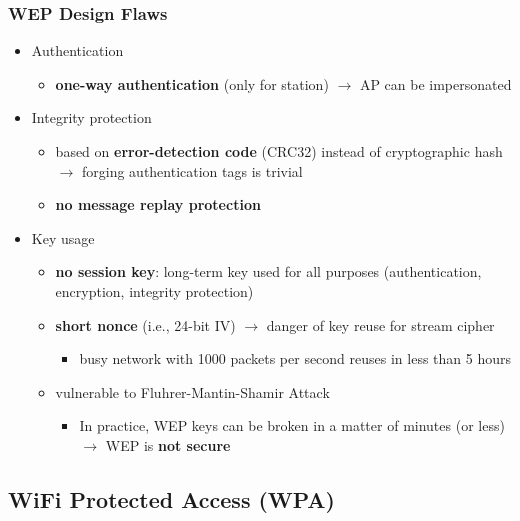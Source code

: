 \documentclass[final]{article}
\begin{document}
\subsubsection*{WEP Design Flaws}
\begin{itemize}[nosep]
    \item Authentication
          \begin{itemize}[nosep]
              \item \textbf{one-way authentication} (only for station) $\rightarrow$ AP can be impersonated
          \end{itemize}
    \item Integrity protection
          \begin{itemize}[nosep]
              \item based on \textbf{error-detection code} (CRC32) instead of cryptographic hash $\rightarrow$ forging authentication tags is trivial
              \item \textbf{no message replay protection}
          \end{itemize}
    \item Key usage
          \begin{itemize}
              \item \textbf{no session key}: long-term key used for all purposes (authentication, encryption, integrity protection)
              \item \textbf{short nonce} (i.e., 24-bit IV) $\rightarrow$ danger of key reuse for stream cipher
                    \begin{itemize}[nosep]
                        \item busy network with 1000 packets per second reuses in less than 5 hours
                    \end{itemize}
              \item vulnerable to Fluhrer-Mantin-Shamir Attack
                    \begin{itemize}[nosep]
                        \item In practice, WEP keys can be broken in a matter of minutes (or less) $\rightarrow$ WEP is \textbf{not secure}
                    \end{itemize}
          \end{itemize}
\end{itemize}
\subsection{WiFi Protected Access (WPA)}
\end{document}
